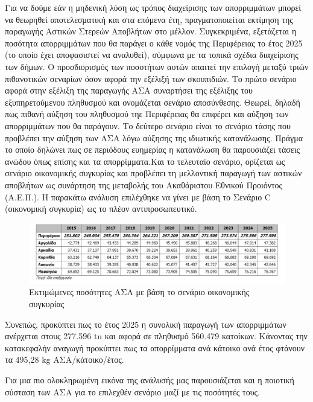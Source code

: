 \documentclass[12pt]{article}
\newcommand{\gr}{\selectlanguage{greek}}
\newcommand{\eng}{\selectlanguage{english}}
\begin{document}
	Για να δούμε εάν η μηδενική λύση ως τρόπος διαχείρισης των απορριμμάτων μπορεί να θεωρηθεί αποτελεσματική και στα επόμενα έτη, πραγματοποιείται εκτίμηση της παραγωγής Αστικών Στερεών Αποβλήτων στο μέλλον. Συγκεκριμένα, εξετάζεται η ποσότητα απορριμμάτων που θα παράγει ο κάθε νομός της Περιφέρειας το έτος 2025 (το οποίο έχει αποφασιστεί να αναλυθεί), σύμφωνα με τα τοπικά σχέδια διαχείρισης των δήμων. Ο προσδιορισμός των ποσοτήτων αυτών απαιτεί την επιλογή μεταξύ τριών πιθανοτικών σεναρίων όσον αφορά την εξέλιξή των σκουπιδιών. Το πρώτο σενάριο αφορά στην εξέλιξη της παραγωγής ΑΣΑ συναρτήσει της εξέλιξης του εξυπηρετούμενου πληθυσμού και ονομάζεται σενάριο αποσύνθεσης. Θεωρεί, δηλαδή πως πιθανή αύξηση του πληθυσμού τηε Περιφέρειας θα επιφέρει και αύξηση των απορριμμάτων που θα παράγουν. Το δεύτερο σενάριο είναι το σενάριο τάσης που προβλέπει την αύξηση των ΑΣΑ λόγω αύξησης της ιδιωτικής κατανάλωσης. Πράγμα το οποίο δηλώνει πως σε περιόδους ευημερίας η κατανάλωση θα παρουσιάζει τάσεις ανώδου όπως επίσης και τα απορρίμματα.Και το τελευταίο σενάριο,  ορίζεται ως σενάριο οικονομικής συγκυρίας και προβλέπει τη μελλοντική παραγωγή των αστικών αποβλήτων ως συνάρτηση της μεταβολής του Ακαθάριστου Εθνικού Προιόντος (Α.Ε.Π.). Η παρακάτω ανάλυση επιλέχθηκε να γίνει με βάση το Σενάριο \eng C \gr (οικονομική συγκυρία) ως το πλέον αντιπροσωπευτικό.
	
	\begin{figure} [H]
		\begin{center}
			\includegraphics [scale = 0.90] {table13.png}
			\caption{Εκτιμώμενες ποσότητες ΑΣΑ με βάση το σενάριο οικονομικής συγκυρίας}
		\end{center}
	\end{figure}

	Συνεπώς, προκύπτει πως το έτος 2025 η συνολική παραγωγή των απορριμμάτων ανέρχεται στους 277.596 tn και αφορά σε πληθυσμό 560.479 κατοίκων. Κάνοντας την κατακεφαλήν αναγωγή προκύπτει πως τα απορρίμματα ανά κάτοικο ανά έτος φτάνουν τα 495,28 kg ΑΣΑ/κάτοικο/έτος. 
	
	Για μια πιο ολοκληρωμένη εικόνα της ανάλυσής μας  παρουσιάζεται και η ποιοτική σύσταση των ΑΣΑ για το επιλεχθέν σενάριο μαζί με τις ποσότητές τους.
	
\end{document}
